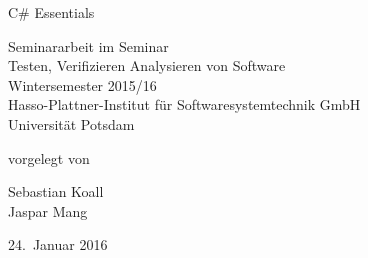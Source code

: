 \documentclass[11pt, a4paper]{article}
\begin{document}
          

\begin{titlepage}
  \begin{center} 
    \mbox{}
    \vspace{1cm}
    
    {\huge C\# Essentials \\[1em] {\LARGE }}  
        
    \vspace{5cm}
    
    Seminararbeit im Seminar \\[1em]
    {\large \sc Testen, Verifizieren Analysieren von Software} \\[1em]
    Wintersemester 2015/16 \\[1em]
    Hasso-Plattner-Institut für Softwaresystemtechnik GmbH \\[1em]
    Universität Potsdam
    
    \vspace{4cm}
    
		vorgelegt von
		
    \vspace{1em}
    
		{\Large Sebastian Koall} \\
		{\Large Jaspar Mang}
		
    \vspace{4em}
    
    24.~Januar 2016
  \end{center}
\end{titlepage}


\setcounter{page}{1}

\tableofcontents 

\newpage

\printnoidxglossaries

\newpage

 
\newpage

\newpage

\newpage

\newpage


\newpage




\end{document}
